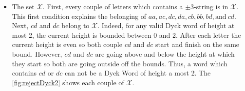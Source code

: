 \begin{tproof}
\begin{table}[htb]
        \newpage
    \end{table}
    \begin{itemize}
        \item The set $\mathcal{X}$. First, every couple of letters which
              contains a $\pm 3$-string is in $\mathcal{X}$. This first
              condition explains the belonging of $aa, ac, dc, da, cb, bb,
                  bd, \textrm{and}\ cd $. Next, $cd$ and $dc$ belong to
              $\mathcal{X}$. Indeed, for any valid Dyck word of
              height at most 2, the current height is bounded between 0 and 2.
              After each letter the current height is even so both couple $cd$
              and $dc$ start and finish on the same bound. However, $cd$
              and $dc$ are going above and below the height at which they start
              so both are going outside off the bounds. Thus, a word which
              contains $cd$ or $dc$ can not be a Dyck Word of height a most 2.
              The \autoref{fig:rejectDyck2} shows each couple of $\mathcal{X}$.


\end{itemize}
\end{tproof}
